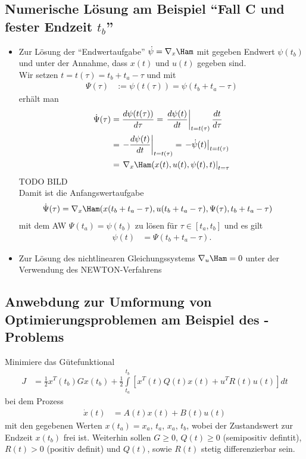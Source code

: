 \subsection{Numerische Lösung am Beispiel "`Fall C und fester Endzeit $t_b$"'}
\begin{itemize}
  \item Zur Lösung der "`Endwertaufgabe"' $\dot{\psi}=\nabla_x \Ham$ mit gegeben Endwert $\psi(t_b)$ und unter der Annahme, dass $x(t)$ und $u(t)$ gegeben sind.\\
  		Wir setzen $t=t(\tau)=t_b+t_a-\tau$ und mit 
  		\begin{align*}
  			\Psi(\tau) & := \psi(t(\tau)) = \psi(t_b+t_a-\tau)
  		\end{align*}
  		erhält man 
  		\begin{align*}
  			\dot{\Psi}(\tau) & = \frac{d\psi(t(\tau))}{d\tau} = \left.\frac{d\psi(t)}{dt}\right|_{t=t(\tau)}\frac{dt}{d\tau}\\
  			& = \left.-\frac{d\psi(t)}{dt}\right|_{t=t(\tau)}=\left.-\dot{\psi}(t)\right|_{t=t(\tau)}\\
  			& = \left.\nabla_x \Ham(x(t),u(t),\psi(t),t)\right|_{t=\tau}
  		\end{align*}
  		TODO BILD\\
  		Damit ist die Anfangswertaufgabe 
  		\begin{align*}
  			\dot{\Psi}(\tau) & = \nabla_x \Ham(x(t_b+t_a-\tau),u(t_b+t_a-\tau),\Psi(\tau),t_b+t_a-\tau)
  		\end{align*}
  		mit dem \ac{AW} $\Psi(t_a)=\psi(t_b)$ zu lösen für $\tau\in[t_a,t_b]$ und es gilt
  		\begin{align*}
  		\psi(t) & = \Psi(t_b+t_a-\tau).
  		\end{align*}
  \item Zur Lösung des nichtlinearen Gleichungssystems $\nabla_u \Ham =0$ unter der Verwendung des NEWTON-Verfahrens
\end{itemize}

\subsection{Anwebdung zur Umformung von Optimierungsproblemen am Beispiel des -Problems}
Minimiere das Gütefunktional
\begin{align*}
	J  & = \frac12 x^T(t_b)Gx(t_b)+\frac12\int\limits_{t_a}^{t_b}\left[x^T(t)Q(t)x(t)+u^TR(t)u(t)\right]dt
\end{align*}
bei dem Prozess 
\begin{align*}
	\dot{x}(t) & = A(t)x(t)+B(t)u(t)
\end{align*}
mit den gegebenen Werten $x(t_a)=x_a$, $t_a$, $x_a$, $t_b$, wobei der Zustandswert zur Endzeit $x(t_b)$ frei ist. Weiterhin sollen $G\ge 0$, $Q(t)\ge 0$ (semipositiv defintit), $R(t)>0$
(positiv definit) und $Q(t)$, sowie $R(t)$ stetig differenzierbar sein.

